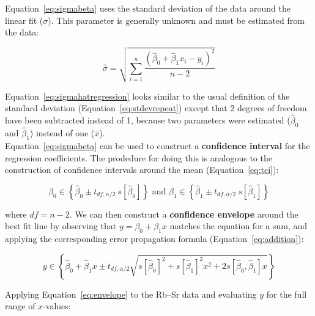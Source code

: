 Equation~\ref{eq:sigmabeta} uses the standard deviation of the data
around the linear fit ($\sigma$). This parameter is generally unknown
and must be estimated from the data:

\begin{equation}
  \hat{\sigma} = \sqrt{\sum\limits_{i=1}^{n}
    \frac{(\hat{\beta}_0+\hat{\beta}_1x_i-y_i)^2}{n-2}}
  \label{eq:sigmahatregression}
\end{equation}

Equation~\ref{eq:sigmahatregression} looks similar to the usual
definition of the standard deviation (Equation~\ref{eq:stdevrepeat})
except that 2 degrees of freedom have been subtracted instead of 1,
because two parameters were estimated ($\hat{\beta}_0$ and
$\hat{\beta}_1$) instead of one ($\bar{x}$).\\

Equation~\ref{eq:sigmabeta} can be used to construct a
\textbf{confidence interval} for the regression coefficients. The
prodedure for doing this is analogous to the construction of
confidence intervals around the mean (Equation~\ref{eq:tci}):

\begin{equation}
  \beta_0 \in \left\{\hat{\beta}_0 \pm t_{df,\alpha/2}~s[\hat{\beta}_0]\right\}
  \mbox{~and~}
  \beta_1 \in \left\{\hat{\beta}_1 \pm t_{df,\alpha/2}~s[\hat{\beta}_1]\right\}
  \label{eq:ciregression}
\end{equation}

\noindent where $df=n-2$. We can then construct a \textbf{confidence
  envelope} around the best fit line by observing that
$y=\beta_0+\beta_1x$ matches the equation for a sum, and applying the
corresponding error propagation formula (Equation~\ref{eq:addition}):

\begin{equation}
  y \in \left\{\hat{\beta}_0 + \hat{\beta}_1 x \pm t_{df,\alpha/2}
  \sqrt{s[\hat{\beta}_0]^2 + s[\hat{\beta}_1]^2 x^2 +
    2 s[\hat{\beta}_0,\hat{\beta}_1]x} \right\}
  \label{eq:envelope}
\end{equation}

Applying Equation~\ref{eq:envelope} to the Rb--Sr data and evaluating
$y$ for the full range of $x$-values:

